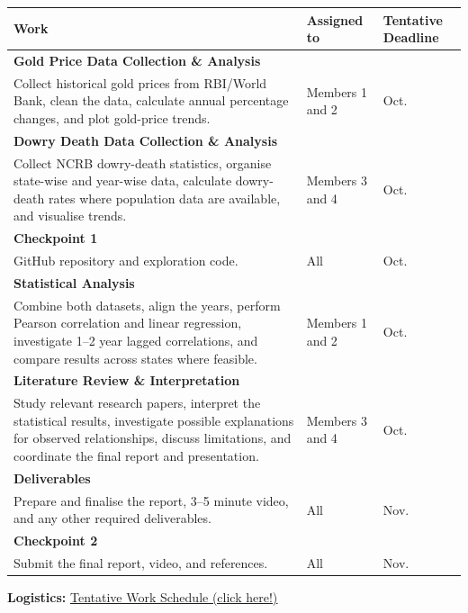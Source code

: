 \documentclass[12pt,a4paper]{article}
\begin{document}
\small
\begin{tabularx}{\textwidth}{
    >{\raggedright\arraybackslash}X
    >{\raggedright\arraybackslash}p{}
    >{\raggedright\arraybackslash}p{}}
\toprule
\textbf{Work} & \textbf{Assigned to} & \textbf{Tentative Deadline} \\
\midrule

\textbf{Gold Price Data Collection \& Analysis}\\
Collect historical gold prices from RBI/World Bank, clean the data, calculate annual percentage changes, and plot gold-price trends.
& Members 1 and 2 & 18 Oct. \\

\textbf{Dowry Death Data Collection \& Analysis}\\
Collect NCRB dowry-death statistics, organise state-wise and year-wise data, calculate dowry-death rates where population data are available, and visualise trends.
& Members 3 and 4 & 18 Oct. \\

\textbf{Checkpoint 1}\\
GitHub repository and exploration code.
& All & 21 Oct. \\

\textbf{Statistical Analysis}\\
Combine both datasets, align the years, perform Pearson correlation and linear regression, investigate 1--2 year lagged correlations, and compare results across states where feasible.
& Members 1 and 2 & 25 Oct. \\

\textbf{Literature Review \& Interpretation}\\
Study relevant research papers, interpret the statistical results, investigate possible explanations for observed relationships, discuss limitations, and coordinate the final report and presentation.
& Members 3 and 4 & 29 Oct. \\

\textbf{Deliverables}\\
Prepare and finalise the report, 3--5 minute video, and any other required deliverables.
& All & 2 Nov. \\

\textbf{Checkpoint 2}\\
Submit the final report, video, and references.
& All & 4 Nov. \\

\bottomrule
\end{tabularx}
\normalsize

\vspace{0.3cm}
\noindent
\textbf{Logistics:}
\href{https://docs.google.com/spreadsheets/d/1lQ2AOhEINstCm4PJfYM4AFiaThnxkLJ8wxjBfKoHUoY/edit?usp=sharing}{\underline{Tentative Work Schedule (click here!)}}
\end{document}
